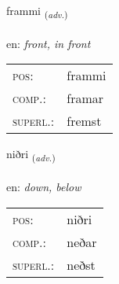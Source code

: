 \documentclass[frontgrid, backgrid]{flacards}\usepackage[]{graphicx}\usepackage[]{color}
\begin{document}
\renewcommand{\flhead}{\vskip5pt \fboxsep=0pt {\small\bfseries\footnotesize Atviksorð | Adverb}}
\renewcommand{\fcfoot}{\vskip5pt \fboxsep=0pt \hspace{2pt}{\small\bfseries\footnotesize 2K}}

\renewcommand{\blhead}{\vskip5pt {\small\bfseries\footnotesize Atviksorð | Adverb }}
\renewcommand{\bcfoot}{\vskip5pt \hspace{2pt}{\small\bfseries\footnotesize 2K}}


{frammi \small{\textsubscript{(\textit{adv.})}} \\[1ex] %
\textphonetic{[framɪ]} \\
en: \emph{front, in front} \\  [2ex]
\renewcommand*{\arraystretch}{0.8}
\begin{tabular}{ll}
\textsc{pos}: & frammi \\ 
\textsc{comp.}: & framar \\ 
\textsc{superl.}: & fremst \\
\end{tabular}
}

\renewcommand{\flhead}{\vskip5pt \fboxsep=0pt {\small\bfseries\footnotesize Atviksorð | Adverb}}
\renewcommand{\fcfoot}{\vskip5pt \fboxsep=0pt \hspace{2pt}{\small\bfseries\footnotesize 2K}}

\renewcommand{\blhead}{\vskip5pt {\small\bfseries\footnotesize Atviksorð | Adverb }}
\renewcommand{\bcfoot}{\vskip5pt \hspace{2pt}{\small\bfseries\footnotesize 2K}}


{niðri \small{\textsubscript{(\textit{adv.})}} \\[1ex] %
\textphonetic{[nɪðrɪ]} \\
en: \emph{down, below} \\  [2ex]
\renewcommand*{\arraystretch}{0.8}
\begin{tabular}{ll}
\textsc{pos}: & niðri \\ 
\textsc{comp.}: & neðar \\ 
\textsc{superl.}: & neðst \\
\end{tabular}
}
\end{document}
